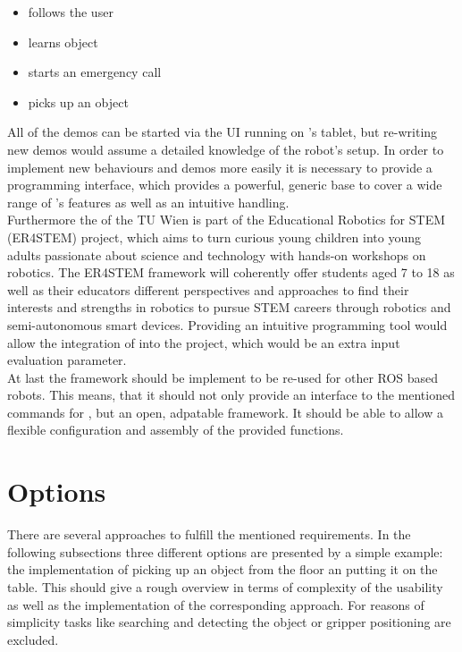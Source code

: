 \begin{itemize}
	\item \hobbit{} follows the user
	\item \hobbit{} learns object
	\item \hobbit{} starts an emergency call
	\item \hobbit{} picks up an object
\end{itemize}

All of the demos can be started via the UI running on \hobbit{}'s tablet, but re-writing new demos would assume a detailed knowledge of the robot's setup. In order to implement new behaviours and demos more easily it is necessary to provide a programming interface, which provides a powerful, generic base to cover a wide range of \hobbit's features as well as an intuitive handling.\\

Furthermore the \ACIN{} of the TU Wien is part of the Educational Robotics for STEM (ER4STEM) project, which aims to turn curious young children into young adults passionate about science and technology with hands-on workshops on robotics. The ER4STEM framework will coherently offer students aged 7 to 18 as well as their educators different perspectives and approaches to find their interests and strengths in robotics to pursue STEM careers through robotics and semi-autonomous smart devices. \cite{ER4STEMACIN} Providing an intuitive programming tool would allow the integration of \hobbit{} into the project, which would be an extra input evaluation parameter.\\

At last the framework should be implement to be re-used for other ROS based robots. This means, that it should not only provide an interface to the mentioned commands for \hobbit{}, but an open, adpatable framework. It should be able to allow a flexible configuration and assembly of the provided functions.

\section{Options}
There are several approaches to fulfill the mentioned requirements. In the following subsections three different options are presented by a simple example: the implementation of picking up an object from the floor an putting it on the table. This should give a rough overview in terms of complexity of the usability as well as the implementation of the corresponding approach. For reasons of simplicity tasks like searching and detecting the object or gripper positioning are excluded.

